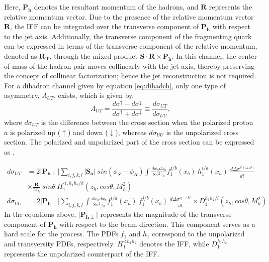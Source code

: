 Here, $\mathbf{P_h}$ denotes the resultant momentum of the hadrons, and $\mathbf{R}$ represents the relative momentum vector. Due to the presence of the relative momentum vector $\mathbf{R}$, the IFF can be integrated over the transverse component of $\mathbf{P_h}$ with respect to the jet axis. Additionally, the transverse component of the fragmenting quark can be expressed in terms of the transverse component of the relative momentum, denoted as $\mathbf{R_T}$, through the mixed product $\mathbf{S \cdot R \times P_h}$. In this channel, the center of mass of the hadron pair moves collinearly with the jet axis, thereby preserving the concept of collinear factorization; hence the jet reconstruction is not required.
For a dihadron channel given by equation \ref{eq:dihadch}, only one type of asymmetry, $A_{UT}$,  exists, which is given by, 
    \begin{equation}
        \label{eq:asymxsec}
        A_{UT} = \frac{d\sigma^\uparrow - d \sigma^\downarrow}{d\sigma^\uparrow + d \sigma^\downarrow} \equiv \frac{d\sigma_{UT}}{d\sigma_{UU}},
    \end{equation}
where $d\sigma_{UT}$ is the difference between the cross section when the polarized proton $a$ is polarized up ($\uparrow$) and down ($\downarrow$), whereas $d\sigma_{UU}$ is the unpolarized cross section. The polarized and unpolarized part of the cross section can be expressed as \cite{Bacchetta:2004it}, 

\begin{align}
\label{eq:xsecut}
    d\sigma_{UT} &= 2|\mathbf{P_{h\perp}}|\sum_{i,j,k,l} |\mathbf{S_a}|\ sin(\phi_S - \phi_R)  \int \frac{dx_a dx_b}{8\pi^2 z_h} f_1^{j/b}(x_b)\ h_1^{i/a}(x_a)\ \frac{d\Delta\sigma^{i^\uparrow j \rightarrow k^\uparrow l}}{d\hat{t}} \nonumber \\
     & \times \frac{\mathbf{R}}{M_h}\ sin\theta \ H_1^{\sphericalangle,h_1h_2/k}(z_h, cos\theta, M_h^2)
\end{align}
\begin{align}
\label{eq:xsecuu}
    d\sigma_{UU} &= 2|\mathbf{P_{h\perp}}|\sum_{i,j,k,l} \int \frac{dx_a dx_b}{8\pi^2 z_h} f_1^{i/a}(x_a)\ f_1^{j/b}(x_b)\ \frac{d\Delta\sigma^{ij \rightarrow kl}}{d\hat{t}} \times  D_1^{h_1h_2/l}(z_h, cos\theta, M_h^2)
\end{align}
In the equations above, $|\mathbf{P_{h\perp}}|$ represents the magnitude of the transverse component of $\mathbf{P_h}$ with respect to the beam direction. This component serves as a hard scale for the process. The PDFs $f_1$ and $h_1$ correspond to the unpolarized and transversity PDFs, respectively. $H_1^{\sphericalangle h_1h_2}$ denotes the IFF, while $D_1^{h_1h_2}$ represents the unpolarized counterpart of the IFF.

